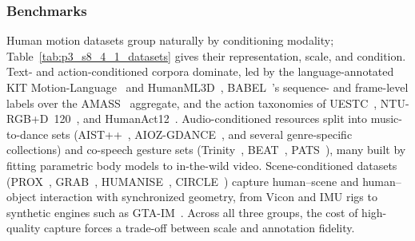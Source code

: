 \subsubsection{Benchmarks}
\label{subsubsec:p3_s8_4_1_benchmarks}
Human motion datasets group naturally by conditioning modality; Table~\ref{tab:p3_s8_4_1_datasets} gives their representation, scale, and condition.
Text- and action-conditioned corpora dominate, led by the language-annotated KIT Motion-Language~\cite{PlappertMA16} and HumanML3D~\cite{GuoZZ0JL022}, BABEL~\cite{PunnakkalCAQB21}'s sequence- and frame-level labels over the AMASS~\cite{mahmood2019amass} aggregate, and the action taxonomies of UESTC~\cite{JiXYSSZ18}, NTU-RGB+D~120~\cite{LiuSPWDK20}, and HumanAct12~\cite{GuoZWZSDG020}.
Audio-conditioned resources split into music-to-dance sets (AIST++~\cite{LiYRK21}, AIOZ-GDANCE~\cite{LePDTT023}, and several genre-specific collections) and co-speech gesture sets (Trinity~\cite{FerstlM18}, BEAT~\cite{LiuZIPLZBZ22}, PATS~\cite{AhujaLNM20}), many built by fitting parametric body models to in-the-wild video.
Scene-conditioned datasets (PROX~\cite{HassanCTB19}, GRAB~\cite{TaheriGBT20}, HUMANISE~\cite{WangCLZLH22}, CIRCLE~\cite{AraujoLVAWGCL23}) capture human--scene and human--object interaction with synchronized geometry, from Vicon and IMU rigs to synthetic engines such as GTA-IM~\cite{CaoGMCVM20}. Across all three groups, the cost of high-quality capture forces a trade-off between scale and annotation fidelity.


